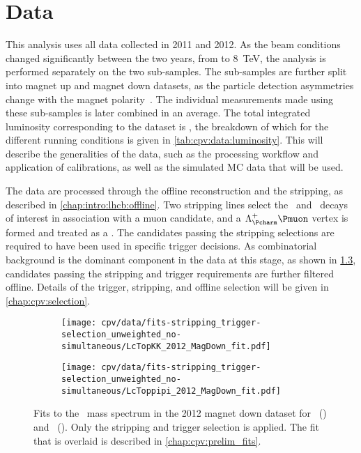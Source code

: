 \chapter{Data}
\label{chap:cpv:data}

This analysis uses all data collected in 2011 and 2012.
As the beam conditions changed significantly between the two years, from 
 to \SI{8}{\TeV}, the analysis is performed separately on the two 
sub-samples.
The sub-samples are further split into magnet up and magnet down datasets, as 
the particle detection asymmetries change with the magnet 
polarity~\cite{Vesterinen:1642153}.
The individual measurements made using these sub-samples is later combined in 
an average.
The total integrated luminosity corresponding to the dataset is \totlumi, the 
breakdown of which for the different running conditions is given in 
\cref{tab:cpv:data:luminosity}.
This  will describe the generalities of the data, 
such as the processing workflow and application of calibrations, as well as the 
simulated \ac{MC} data that will be used.

The data are processed through the offline reconstruction and the stripping, as 
described in \cref{chap:intro:lhcb:offline}.
Two stripping lines select the \LcTopKK\ and \LcToppipi\ decays of interest in 
association with a muon candidate, and a $\PLambdac\Pmuon$ vertex is formed and 
treated as a \PLambdab.
The candidates passing the stripping selections are required to have been used 
in specific trigger decisions.
As combinatorial background is the dominant component in the data at this 
stage, as shown in \cref{fig:cpv:data:mass}, candidates passing the stripping 
and trigger requirements are further filtered offline.
Details of the trigger, stripping, and offline selection will be given in 
\cref{chap:cpv:selection}.

\begin{figure}
  \begin{subfigure}[b]{0.5\textwidth}
    \texttt{[image: cpv/data/fits-stripping\_trigger-selection\_unweighted\_no-simultaneous/LcTopKK\_2012\_MagDown\_fit.pdf]}
    \caption{\pKK}
    \label{fig:cpv:data:mass:pKK}
  \end{subfigure}
  \begin{subfigure}[b]{0.5\textwidth}
    \texttt{[image: cpv/data/fits-stripping\_trigger-selection\_unweighted\_no-simultaneous/LcToppipi\_2012\_MagDown\_fit.pdf]}
    \caption{\ppipi}
    \label{fig:cpv:data:mass:ppipi}
  \end{subfigure}
  \caption{%
    Fits to the \PLambdac\ mass spectrum in the 2012 magnet down dataset for 
    \pKK\ () and \ppipi\ 
    ().
    Only the stripping and trigger selection is applied.
    The fit that is overlaid is described in \cref{chap:cpv:prelim_fits}.
  }
  \label{fig:cpv:data:mass}
\end{figure}

